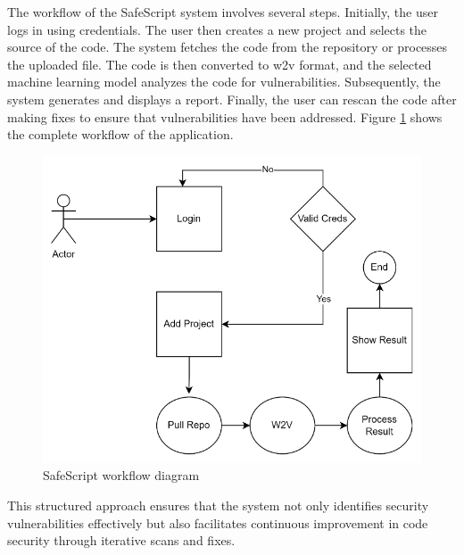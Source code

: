 The workflow of the SafeScript system involves several steps. Initially, the user logs in using credentials. 
The user then creates a new project and selects the source of the code. 
The system fetches the code from the repository or processes the uploaded file. 
The code is then converted to w2v format, and the selected machine learning model analyzes the code for vulnerabilities. 
Subsequently, the system generates and displays a report. Finally, the user can rescan the code after making fixes to ensure that vulnerabilities have been addressed.
Figure \ref{fig:workflow} shows the complete workflow of the application.

\begin{figure}[H]
    \centering
    \includegraphics[width=0.9\linewidth]{images/workflow.png}
    \caption{SafeScript workflow diagram}
    \label{fig:workflow}
\end{figure}

This structured approach ensures that the system not only identifies security vulnerabilities effectively but also facilitates continuous improvement in code security through iterative scans and fixes.